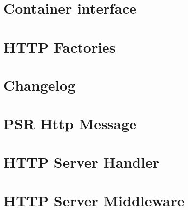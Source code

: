 \documentclass[twoside]{book}
\newcommand{\+}{\discretionary{\mbox{\scriptsize$\hookleftarrow$}}{}{}}
\begin{document}
\chapter{Container interface}
\label{md__c__workspace__proyecto__p_h_p_project_vendor_psr_container__r_e_a_d_m_e}

\chapter{HTTP Factories}
\label{md__c__workspace__proyecto__p_h_p_project_vendor_psr_http_factory__r_e_a_d_m_e}

\chapter{Changelog}
\label{md__c__workspace__proyecto__p_h_p_project_vendor_psr_http_message__c_h_a_n_g_e_l_o_g}

\chapter{PSR Http Message}
\label{md__c__workspace__proyecto__p_h_p_project_vendor_psr_http_message__r_e_a_d_m_e}

\chapter{HTTP Server Handler}
\label{md__c__workspace__proyecto__p_h_p_project_vendor_psr_http_server_handler__r_e_a_d_m_e}

\chapter{HTTP Server Middleware}
\label{md__c__workspace__proyecto__p_h_p_project_vendor_psr_http_server_middleware__r_e_a_d_m_e}

\end{document}
